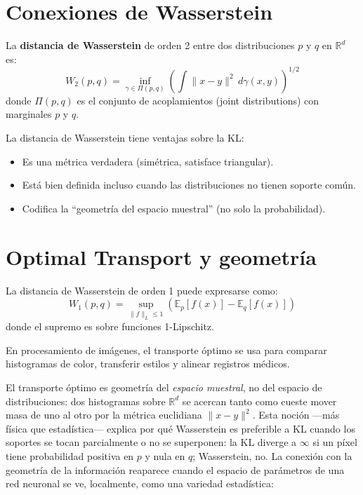 \section{Conexiones de Wasserstein}

\begin{definition}
	La \textbf{distancia de Wasserstein} de orden 2 entre dos distribuciones $p$ y $q$ en $\mathbb{R}^d$ es:
	\[
	W_2(p, q) = \inf_{\gamma \in \Pi(p,q)} \left(\int \|x - y\|^2 \, d\gamma(x,y)\right)^{1/2}
	\]
	donde $\Pi(p,q)$ es el conjunto de acoplamientos (joint distributions) con marginales $p$ y $q$.
\end{definition}

\begin{proposition}
	La distancia de Wasserstein tiene ventajas sobre la KL:
	\begin{itemize}
		\item Es una métrica verdadera (simétrica, satisface triangular).
		\item Está bien definida incluso cuando las distribuciones no tienen soporte común.
		\item Codifica la ``geometría del espacio muestral'' (no solo la probabilidad).
	\end{itemize}
\end{proposition}

\section{Optimal Transport y geometría}

\begin{theorem}
	La distancia de Wasserstein de orden 1 puede expresarse como:
	\[
	W_1(p, q) = \sup_{\|f\|_L \le 1} \left(\mathbb{E}_p[f(x)] - \mathbb{E}_q[f(x)]\right)
	\]
	donde el supremo es sobre funciones 1-Lipschitz.
\end{theorem}

\begin{example}
	En procesamiento de imágenes, el transporte óptimo se usa para comparar histogramas de color, transferir estilos y alinear registros médicos.
\end{example}

\bigskip
\noindent
El transporte óptimo es geometría del \emph{espacio muestral}, no del espacio de distribuciones: dos histogramas sobre $\mathbb{R}^d$ se acercan tanto como cueste mover masa de uno al otro por la métrica euclidiana $\|x-y\|^2$. Esta noción ---más física que estadística--- explica por qué Wasserstein es preferible a KL cuando los soportes se tocan parcialmente o no se superponen: la KL diverge a $\infty$ si un píxel tiene probabilidad positiva en $p$ y nula en $q$; Wasserstein, no. La conexión con la geometría de la información reaparece cuando el espacio de parámetros de una red neuronal se ve, localmente, como una variedad estadística:

